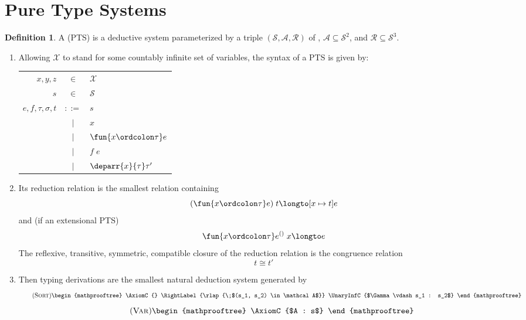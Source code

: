\documentclass[11pt]{article} %
\theoremstyle{definition}
\newtheorem{definition}{Definition}
\theoremstyle{remark}
\begin{document}
\section{Pure Type Systems}
\label{sec:pure-type-systems}

\begin{definition}
A  (PTS) is a deductive system parameterized by a triple $(\mathcal S, \mathcal A, \mathcal R)$ of ,  $\mathcal A \subseteq \mathcal S^2$, and  $\mathcal R \subseteq \mathcal S^3$.
\begin{enumerate}[label=\textit{\roman*})]
\item
  Allowing $\mathcal X$ to stand for some countably infinite set of variables, the syntax of a PTS is given by:
  \begin{center}
  \begin{tabular}{rcl}
  $x,y,z$ & $\in$ & $\mathcal X$ \\
  $s$ & $\in$ & $\mathcal S$ \\
  $e,f,\tau,\sigma, t$ & $::=$ & $s$ \\
    & $\mid$ & $x$ \\
    & $\mid$ & $\fun{x \ordcolon \tau}e$ \\
    & $\mid$ & $f\;e$ \\
    & $\mid$ & $\deparr{x}{\tau} \tau'$ \\
  \end{tabular}
  \end{center}
\item
  Its reduction relation is the smallest relation containing
    $$(\fun{x \ordcolon \tau}e)\;t \longto [x \mapsto t]e$$
  and (if an extensional PTS)
    $$\fun{x \ordcolon \tau}e^{()}\;x \longto e$$
  The reflexive, transitive, symmetric, compatible closure of the reduction relation is the congruence relation
    $$t \cong t'$$
\item
  Then typing derivations are the smallest natural deduction system generated by
  \begin{equation}\tag{\textsc{Sort}}
  \begin{mathprooftree}
    \AxiomC{}
    \RightLabel{\rlap{\;$(s_1, s_2) \in \mathcal A$}}
    \UnaryInfC{$\Gamma \vdash s_1 : s_2$}
  \end{mathprooftree}
  \end{equation}
  \begin{equation}\tag{\textsc{Var}}\label{eqn:pts-var}
  \begin{mathprooftree}
    \AxiomC{$A : s$}

\end{mathprooftree}
\end{equation}
\end{enumerate}
\end{definition}
\end{document}
